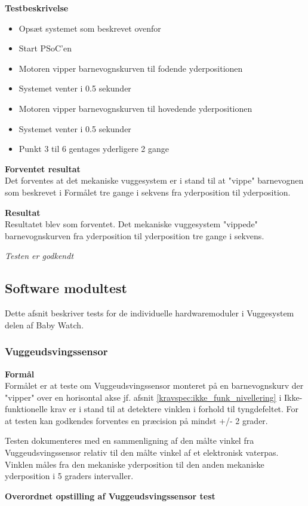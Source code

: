 \textbf{Testbeskrivelse}
\begin{itemize}
	\item Opsæt systemet som beskrevet ovenfor
	\item Start PSoC'en
	\item Motoren vipper barnevognskurven til fodende yderpositionen
	\item Systemet venter i 0.5 sekunder
	\item Motoren vipper barnevognskurven til hovedende yderpositionen
	\item Systemet venter i 0.5 sekunder
	\item Punkt 3 til 6 gentages yderligere 2 gange
\end{itemize}

\textbf{Forventet resultat} \\
Det forventes at det mekaniske vuggesystem er i stand til at "vippe" barnevognen som beskrevet i Formålet tre gange i sekvens fra yderposition til yderposition.

\textbf{Resultat} \\
Resultatet blev som forventet. Det mekaniske vuggesystem "vippede" barnevognskurven fra yderposition til yderposition tre gange i sekvens.

\textit{Testen er godkendt}


\subsection{Software modultest}
Dette afsnit beskriver tests for de individuelle hardwaremoduler i Vuggesystem delen af Baby Watch.
\subsubsection{Vuggeudsvingssensor}
\textbf{Formål} \\
Formålet er at teste om Vuggeudsvingssensor monteret på en barnevognskurv der "vipper" over en horisontal akse jf. afsnit \vref{kravspec:ikke_funk_nivellering} i Ikke-funktionelle krav er i stand til at detektere vinklen i forhold til tyngdefeltet. For at testen kan godkendes forventes en præcision på mindst +/- 2 grader.

Testen dokumenteres med en sammenligning af den målte vinkel fra Vuggeudsvingssensor relativ til den målte vinkel af et elektronisk vaterpas. Vinklen måles fra den mekaniske yderposition til den anden mekaniske yderposition i 5 graders intervaller.

\textbf{Overordnet opstilling af Vuggeudsvingssensor test}

